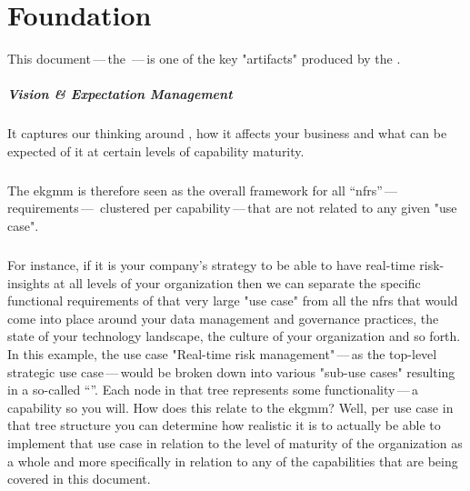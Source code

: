 \chapter{ Foundation}
\label{ch:ekg-foundation}

This document\,---\,the \,---\,is one of the key "artifacts" produced by the .

\paragraph{Vision \& Expectation Management}

It captures our thinking around ,
how it affects your business and what can be expected of it at certain levels of capability maturity.

\paragraph{}

The \gls{ekgmm} is therefore seen as the overall framework for all \enquote{\glspl{nfr}}\,---\,requirements\,---\,%
clustered per capability\,---\,that are not  related to any given "use case".

\paragraph{}

For instance, if it is your company's strategy to be able to have real-time risk-insights at all levels
of your organization then we can separate the specific functional requirements of that very large "use case" from
all the \glspl{nfr} that would come into place around your data management and governance practices, the state of
your technology landscape, the culture of your organization and so forth.
In this example, the use case "Real-time risk management"\,---\,as the top-level strategic use case\,---\,would be
broken down into various "sub-use cases" resulting in a so-called \enquote{}.
Each node in that tree represents some functionality\,---\,a capability so you will.
How does this relate to the \gls{ekgmm}? Well, per use case in that tree structure you can determine how realistic
it is to actually be able to implement that use case in relation to the level of maturity of the organization as a
whole and more specifically in relation to any of the capabilities that are being covered in this document.

